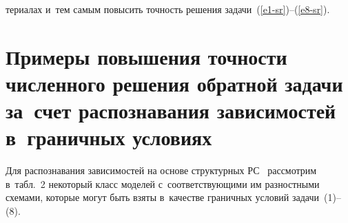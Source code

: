 \begin{multicols}{2}
\vspace*{12pt}

\addtocounter{table}{1}

\noindent
териалах и~тем самым повысить точность решения 
задачи~(\ref{e1-sr})--(\ref{e8-sr}).


  
  
\section{Примеры повышения точности численного решения обратной 
задачи за~счет распознавания зависимостей в~граничных условиях}
 
  Для распознавания зависимостей на основе структурных 
  РС~\cite{5-sr, 18-sr, 19-sr} рассмотрим в~табл.~2 некоторый класс моделей 
с~соответствующими им разностными схемами, которые могут быть взяты 
в~качестве граничных условий задачи~(1)--(8).

{\begin{table*}\small %
\begin{center}
\vspace*{2ex}


\end{center}
\end{table*}}
\end{multicols}
